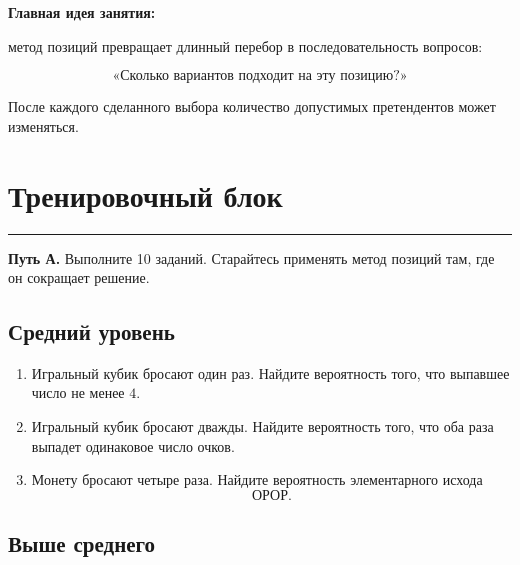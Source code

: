 \documentclass[a4paper,12pt]{article}
\newcommand{\sectionline}{%
    \vspace{0.2em}
    {\color{accent}\rule{\linewidth}{0.7pt}}
    \vspace{0.4em}
}
\newcommand{\important}[1]{%
    \par\smallskip
    {\color{darkaccent}\textbf{#1}}
    \par\smallskip
}
\begin{document}
\important{Главная идея занятия:}
метод позиций превращает длинный перебор в последовательность вопросов:

\[
\boxed{
\text{«Сколько вариантов подходит на эту позицию?»}
}
\]

После каждого сделанного выбора количество допустимых претендентов может изменяться.


\newpage
\section*{Тренировочный блок}
\sectionline

\textbf{Путь А.} Выполните 10 заданий. Старайтесь применять метод позиций там, где он сокращает решение.

\subsection*{Средний уровень}

\begin{enumerate}[leftmargin=2em,label=\textbf{\arabic*.}]

    \item
    Игральный кубик бросают один раз. Найдите вероятность того, что выпавшее число не менее \(4\).

    \item
    Игральный кубик бросают дважды. Найдите вероятность того, что оба раза выпадет одинаковое число очков.

    \item
    Монету бросают четыре раза. Найдите вероятность элементарного исхода
    \[
    \text{ОРОР}.
    \]

\end{enumerate}

\subsection*{Выше среднего}
\end{document}
